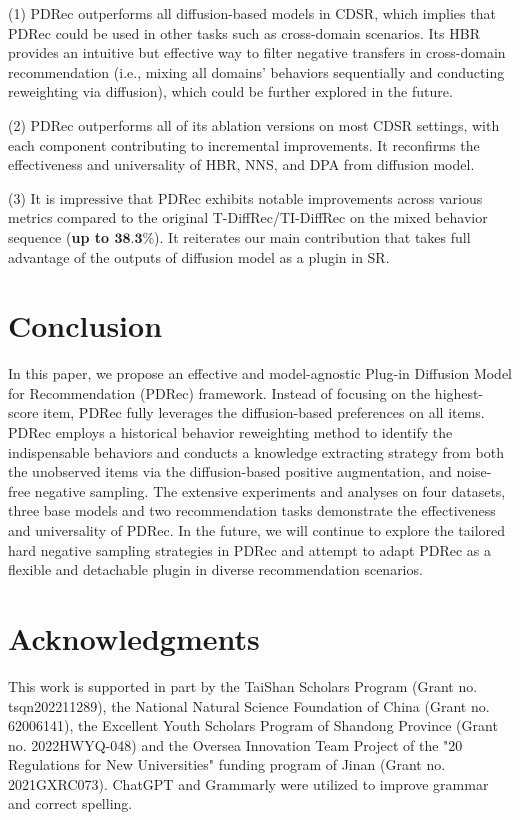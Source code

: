 \documentclass[letterpaper]{article} %
\begin{document}
(1) PDRec outperforms all diffusion-based models in CDSR, which implies that PDRec could be used in other tasks such as cross-domain scenarios. Its HBR provides an intuitive but effective way to filter negative transfers in cross-domain recommendation (i.e., mixing all domains' behaviors sequentially and conducting reweighting via diffusion), which could be further explored in the future.

(2) PDRec outperforms all of its ablation versions on most CDSR settings, with each component contributing to incremental improvements. It reconfirms the effectiveness and universality of HBR, NNS, and DPA from diffusion model.

(3) It is impressive that PDRec exhibits notable improvements across various metrics compared to the original T-DiffRec/TI-DiffRec on the mixed behavior sequence (\textbf{up to $\textbf{38.3\%}$}). It reiterates our main contribution that takes full advantage of the outputs of diffusion model as a plugin in SR.

\section{Conclusion}
In this paper, we propose an effective and model-agnostic Plug-in Diffusion Model for Recommendation (PDRec) framework. Instead of focusing on the highest-score item, PDRec fully leverages the diffusion-based preferences on all items. PDRec employs a historical behavior reweighting method to identify the indispensable behaviors and conducts a knowledge extracting strategy from both the unobserved items via the diffusion-based positive augmentation, and noise-free negative sampling. The extensive experiments and analyses on four datasets, three base models and two recommendation tasks demonstrate the effectiveness and universality of PDRec. In the future, we will continue to explore the tailored hard negative sampling strategies in PDRec and attempt to adapt PDRec as a flexible and detachable plugin in diverse recommendation scenarios.


\section{Acknowledgments}
This work is supported in part by the TaiShan Scholars Program (Grant no. tsqn202211289), the National Natural Science Foundation of China (Grant no. 62006141), the Excellent Youth Scholars Program of Shandong Province (Grant no. 2022HWYQ-048) and the Oversea Innovation Team Project of the  "20 Regulations for New Universities" funding program of Jinan (Grant no. 2021GXRC073). ChatGPT and Grammarly were utilized to improve grammar and correct spelling.


\end{document}
